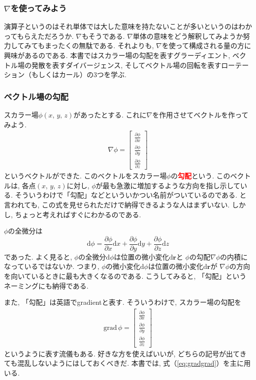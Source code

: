 \subsubsection{$\nabla$を使ってみよう}
演算子というのはそれ単体では大した意味を持たないことが多いというのはわかってもらえただろうか. 
$\nabla$もそうである. $\nabla$単体の意味をどう解釈してみようか努力してみてもまったくの無駄である. 
それよりも, $\nabla$を使って構成される量の方に興味があるのである. 
本書ではスカラー場の勾配を表すグラーディエント, ベクトル場の発散を表すダイバージェンス, 
そしてベクトル場の回転を表すローテーション（もしくはカール）の3つを学ぶ. 

\subsubsection{ベクトル場の勾配}
スカラー場$\phi(x, \, y, \, z)$があったとする. これに$\nabla$を作用させてベクトルを作ってみよう. 
\begin{eqnarray}
\nabla \phi = \left[
 \begin{array}{c}
\displaystyle
\frac{\partial \phi}{\partial x} \\
\displaystyle
\frac{\partial \phi}{\partial y} \\
\displaystyle
\frac{\partial \phi}{\partial z} 
 \end{array}
\right]
\label{eq:gradnabla}
\end{eqnarray}
というベクトルができた. このベクトルをスカラー場$\phi$の\textbf{\textcolor{red}{勾配}}という. 
このベクトルは, 各点$(x, \, y, \, z)$に対し, $\phi$が最も急激に増加するような方向を指し示している. 
そういうわけで「勾配」などといういかつい名前がついているのである. 
と言われても, この式を見せられただけで納得できるような人はまずいない. 
しかし, ちょっと考えればすぐにわかるのである. 

$\phi$の全微分は
$$
\mathrm{d} \phi = \frac{\partial \phi}{\partial x} \mathrm{d} x 
+ \frac{\partial \phi}{\partial y} \mathrm{d} y +  \frac{\partial \phi}{\partial z} \mathrm{d} z
$$
であった. よく見ると, $\phi$の全微分$\mathrm{d}\phi$は位置の微小変化$\mathrm{d}\bm{r}$と
$\phi$の勾配$\nabla \phi$の内積になっているではないか. 
つまり, $\phi$の微小変化$\mathrm{d}\phi$は位置の微小変化$\mathrm{d}\bm{r}$が
$\nabla \phi$の方向を向いているときに最も大きくなるのである. 
こうしてみると, 「勾配」というネーミングにも納得である. 

また, 「勾配」は英語でgradientと表す. そういうわけで, スカラー場の勾配を
\begin{eqnarray}
\mathrm{grad} \, \phi = \left[
 \begin{array}{c}
\displaystyle
\frac{\partial \phi}{\partial x} \\
\displaystyle
\frac{\partial \phi}{\partial y} \\
\displaystyle
\frac{\partial \phi}{\partial z} 
 \end{array}
\right]
\label{eq:gradgrad}
\end{eqnarray}
というように表す流儀もある. 好きな方を使えばいいが, どちらの記号が出てきても混乱しないようにはしておくべきだ. 
本書では, 式（\ref{eq:gradgrad}）を主に用いる. 
